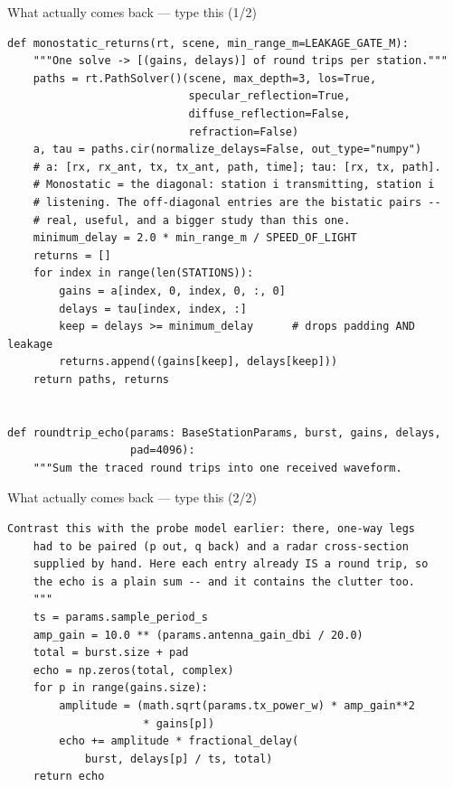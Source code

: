 \documentclass[10pt]{beamer}
\begin{document}
\begin{frame}[fragile]{What actually comes back --- type this (1/2)}
\begin{lstlisting}[basicstyle=\ttfamily\tiny]
def monostatic_returns(rt, scene, min_range_m=LEAKAGE_GATE_M):
    """One solve -> [(gains, delays)] of round trips per station."""
    paths = rt.PathSolver()(scene, max_depth=3, los=True,
                            specular_reflection=True,
                            diffuse_reflection=False,
                            refraction=False)
    a, tau = paths.cir(normalize_delays=False, out_type="numpy")
    # a: [rx, rx_ant, tx, tx_ant, path, time]; tau: [rx, tx, path].
    # Monostatic = the diagonal: station i transmitting, station i
    # listening. The off-diagonal entries are the bistatic pairs --
    # real, useful, and a bigger study than this one.
    minimum_delay = 2.0 * min_range_m / SPEED_OF_LIGHT
    returns = []
    for index in range(len(STATIONS)):
        gains = a[index, 0, index, 0, :, 0]
        delays = tau[index, index, :]
        keep = delays >= minimum_delay      # drops padding AND leakage
        returns.append((gains[keep], delays[keep]))
    return paths, returns


def roundtrip_echo(params: BaseStationParams, burst, gains, delays,
                   pad=4096):
    """Sum the traced round trips into one received waveform.
\end{lstlisting}
\end{frame}

\begin{frame}[fragile]{What actually comes back --- type this (2/2)}
\begin{lstlisting}[basicstyle=\ttfamily\tiny]
    Contrast this with the probe model earlier: there, one-way legs
    had to be paired (p out, q back) and a radar cross-section
    supplied by hand. Here each entry already IS a round trip, so
    the echo is a plain sum -- and it contains the clutter too.
    """
    ts = params.sample_period_s
    amp_gain = 10.0 ** (params.antenna_gain_dbi / 20.0)
    total = burst.size + pad
    echo = np.zeros(total, complex)
    for p in range(gains.size):
        amplitude = (math.sqrt(params.tx_power_w) * amp_gain**2
                     * gains[p])
        echo += amplitude * fractional_delay(
            burst, delays[p] / ts, total)
    return echo
\end{lstlisting}
\end{frame}
\end{document}
